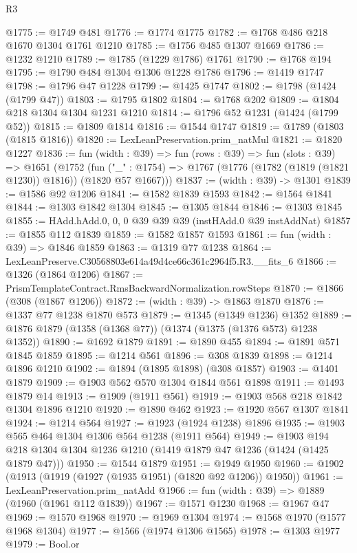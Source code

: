 \begin{lexlean}{R3}
\begin{coremodule}
@1775 := @1749 @481
@1776 := @1774 @1775
@1782 := @1768 @486 @218 @1670 @1304 @1761 @1210
@1785 := @1756 @485 @1307 @1669
@1786 := @1232 @1210
@1789 := @1785 (@1229 @1786) @1761
@1790 := @1768 @194
@1795 := @1790 @484 @1304 @1306 @1228 @1786
@1796 := @1419 @1747
@1798 := @1796 @47 @1228
@1799 := @1425 @1747
@1802 := @1798 (@1424 (@1799 @47))
@1803 := @1795 @1802
@1804 := @1768 @202
@1809 := @1804 @218 @1304 @1304 @1231 @1210
@1814 := @1796 @52 @1231 (@1424 (@1799 @52))
@1815 := @1809 @1814
@1816 := @1544 @1747
@1819 := @1789 (@1803 (@1815 @1816))
@1820 := LexLeanPreservation.prim_natMul
@1821 := @1820 @1227
@1836 := fun (width : @39) =>
  fun (rows : @39) =>
  fun (slots : @39) =>
  @1651
    (@1752
      (fun ("_" : @1754) => @1767 (@1776 (@1782 (@1819 (@1821 @1230)) @1816)) (@1820 @57 @1667)))
@1837 := (width : @39) -> @1301
@1839 := @1586 @92 @1206
@1841 := @1582 @1839 @1593
@1842 := @1564 @1841
@1844 := @1303 @1842 @1304
@1845 := @1305 @1844
@1846 := @1303 @1845
@1855 := HAdd.hAdd.{0, 0, 0} @39 @39 @39 (instHAdd.{0} @39 instAddNat)
@1857 := @1855 @112 @1839
@1859 := @1582 @1857 @1593
@1861 := fun (width : @39) => @1846 @1859
@1863 := @1319 @77 @1238
@1864 := LexLeanPreserve.C30568803e614a49d4ce66c361c2964f5.R3.__fits_6
@1866 := @1326 (@1864 @1206)
@1867 := PrismTemplateContract.RmsBackwardNormalization.rowSteps
@1870 := @1866 (@308 (@1867 @1206))
@1872 := (width : @39) -> @1863 @1870
@1876 := @1337 @77 @1238 @1870 @573
@1879 := @1345 (@1349 @1236) @1352
@1889 := @1876 @1879 (@1358 (@1368 @77)) (@1374 (@1375 (@1376 @573) @1238 @1352))
@1890 := @1692 @1879
@1891 := @1890 @455
@1894 := @1891 @571 @1845 @1859
@1895 := @1214 @561
@1896 := @308 @1839
@1898 := @1214 @1896 @1210
@1902 := @1894 (@1895 @1898) (@308 @1857)
@1903 := @1401 @1879
@1909 := @1903 @562 @570 @1304 @1844 @561 @1898
@1911 := @1493 @1879 @14
@1913 := @1909 (@1911 @561)
@1919 := @1903 @568 @218 @1842 @1304 @1896 @1210
@1920 := @1890 @462
@1923 := @1920 @567 @1307 @1841
@1924 := @1214 @564
@1927 := @1923 (@1924 @1238) @1896
@1935 := @1903 @565 @464 @1304 @1306 @564 @1238 (@1911 @564)
@1949 := @1903 @194 @218 @1304 @1304 @1236 @1210 (@1419 @1879 @47 @1236 (@1424 (@1425 @1879 @47)))
@1950 := @1544 @1879
@1951 := @1949 @1950
@1960 := @1902 (@1913 (@1919 (@1927 (@1935 @1951) (@1820 @92 @1206)) @1950))
@1961 := LexLeanPreservation.prim_natAdd
@1966 := fun (width : @39) => @1889 (@1960 (@1961 @112 @1839))
@1967 := @1571 @1230
@1968 := @1967 @47
@1969 := @1570 @1968
@1970 := @1969 @1304
@1974 := @1568 @1970 (@1577 @1968 @1304)
@1977 := @1566 (@1974 @1306 @1565)
@1978 := @1303 @1977
@1979 := Bool.or

\end{coremodule}
\end{lexlean}
